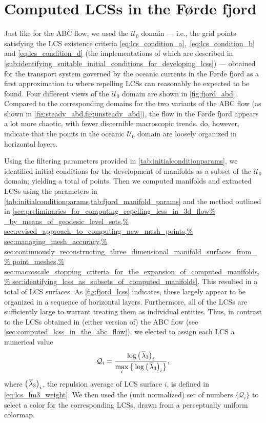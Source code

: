 \section{Computed LCSs in the Førde fjord}
\label{sec:computed_lcss_in_the_forde_fjord}

Just like for the ABC flow, we used the $\mathcal{U}_{0}$ domain --- i.e.,
the grid points satisfying the LCS existence criteria
\eqref{eq:lcs_condition_a},~\eqref{eq:lcs_condition_b} and
\eqref{eq:lcs_condition_d} (the implementations of which are described in
\cref{sub:identifying_suitable_initial_conditions_for_developing_lcss}) ---
obtained for the transport system governed by the oceanic currents in the
Førde fjord as a first approximation to where repelling LCSs can reasonably
be expected to be found. Four different views of the $\mathcal{U}_{0}$ domain
are shown in \cref{fig:fjord_abd}. Compared to the corresponding domains
for the two variants of the ABC flow (as shown in
\cref{fig:steady_abd,fig:unsteady_abd}), the flow in the Førde fjord appears
a lot more chaotic, with fewer discernible macroscopic trends.
 do, however, indicate that the
points in the oceanic $\mathcal{U}_{0}$ domain are loosely organized
in horizontal layers.



Using the filtering parameters provided in \cref{tab:initialconditionparams},
we identified initial conditions for the development of manifolds as a subset
of the $\mathcal{U}_{0}$ domain; yielding a total of  points.
Then we computed manifolds and extracted LCSs using the parameters
in \cref{tab:initialconditionparams,tab:fjord_manifold_params} and the method
outlined in \cref{sec:preliminaries_for_computing_repelling_lcss_in_3d_flow%
    _by_means_of_geodesic_level_sets,%
    sec:revised_approach_to_computing_new_mesh_points,%
    sec:managing_mesh_accuracy,%
    sec:continuously_reconstructing_three_dimensional_manifold_surfaces_from_%
    point_meshes,%
    sec:macroscale_stopping_criteria_for_the_expansion_of_computed_manifolds,%
    sec:identifying_lcss_as_subsets_of_computed_manifolds}. This resulted in
a total of  LCS surfaces. As \cref{fig:fjord_lcss} indicates,
these largely appear to be organized in a sequence of horizontal layers.
Furthermore, all of the LCSs are sufficiently large to warrant treating them
as individual entities. Thus, in contrast to the LCSs obtained in (either
version of) the ABC flow (see \cref{sec:computed_lcss_in_the_abc_flow}), we
elected to assign each LCS a numerical value
\begin{equation}
    \label{eq:fjord_lcs_colorscaling}
    \mathcal{Q}_{i} = %
    \frac{\log{{\big({\mkern2mu}\overline{\lambda}_{3}\big)}_{i}}}%
    {\max\limits_{i}%
    \big\{\log{{\big({\mkern2mu}\overline{\lambda}_{3}\big)}_{i}}\big\}},
\end{equation}
where ${\big({\mkern2mu}\overline{\lambda}_{3}}\big)_{i}$, the repulsion
average of LCS surface $i$, is defined in \cref{eq:lcs_lm3_weight}. We then
used the (unit normalized) set of numbers $\big\{\mathcal{Q}_{i}\big\}$ to
select a color for the corresponding LCSs, drawn from a perceptually uniform
colormap.

